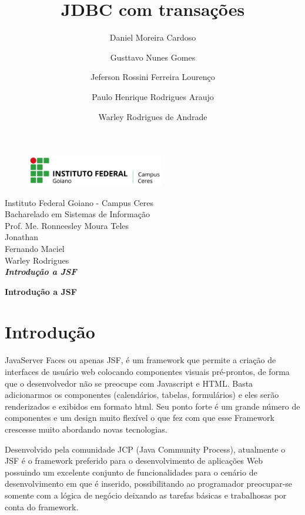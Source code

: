 \documentclass[12pt,a4paper]{article}
\title{JDBC com transações}
\author{Daniel Moreira Cardoso \and Gusttavo Nunes Gomes\and Jeferson Rossini Ferreira Lourenço\and Paulo Henrique Rodrigues Araujo\and Warley Rodrigues de Andrade}
\begin{document}
\begin{titlepage}
\begin{center}
\begin{figure}[htb]
                
                \label{figura:LogoIF}
        
                \centering
                \includegraphics[width=6cm]{recursos/imagens/logo.png} 
\end{figure}
Instituto Federal Goiano - Campus Ceres\\
Bacharelado em Sistemas de Informação\\
Prof. Me. Ronneesley Moura Teles\\\vspace{0.5cm}
Jonathan\\
Fernando Maciel\\
Warley Rodrigues\\
\vspace{5.0cm}
\textit{\textbf{\Large{Introdução a JSF}}}\\\vspace{0.5cm}
\vspace{9.5cm}
\end{center}
\end{titlepage}
\tableofcontents
\newpage
\begin{center}
\textbf{\Large{Introdução a JSF}}\\\vspace{0.5cm}
\end{center}

\section{Introdução}
JavaServer Faces ou apenas JSF, é um framework que permite a criação de interfaces de usuário web colocando componentes visuais pré-prontos, de forma que o desenvolvedor não se preocupe com Javascript e HTML. Basta adicionarmos os componentes (calendários, tabelas, formulários) e eles serão renderizados e exibidos em formato html. Seu ponto forte é um grande número de componentes e um design muito flexível o que fez com que esse Framework crescesse muito abordando novas tecnologias.

Desenvolvido pela comunidade JCP (Java Community Process), atualmente o JSF é o framework preferido para o desenvolvimento de aplicações Web possuindo um excelente conjunto de funcionalidades para o cenário de desenvolvimento em que é inserido, possibilitando ao programador preocupar-se somente com a lógica de negócio deixando as tarefas básicas e trabalhosas por conta do framework.
\end{document}
